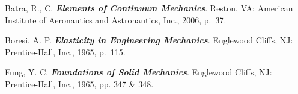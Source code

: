 \documentclass{AeroStructure-ERJohnson}
\begin{document}
\begin{thebibliography}{}
\bibitem{}
Batra, R., C. \textit{\textbf{Elements of Continuum Mechanics}}. Reston, VA: American Institute of Aeronautics and Astronautics, Inc., 2006, p.~37.

\bibitem{}
Boresi, A. P. \textit{\textbf{Elasticity in Engineering Mechanics}}. Englewood Cliffs, NJ: Prentice-Hall, Inc., 1965, p.~115.

\bibitem{}
Fung, Y. C. \textit{\textbf{Foundations of Solid Mechanics}}. Englewood Cliffs, NJ: Prentice-Hall, Inc., 1965, pp. 347 \& 348.
\end{thebibliography}
\end{document}
